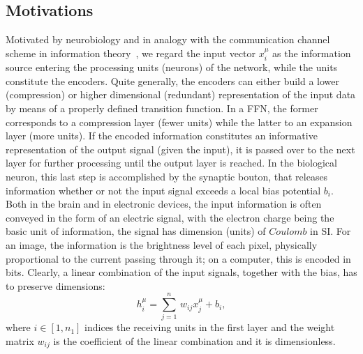\documentclass{article}
\begin{document}
\subsection{Motivations} \label{sub:mot}
%
 Motivated by neurobiology and in analogy with the communication channel scheme in information theory~\cite{mckay, jaynes}, we regard the input vector $x^{\mu}_i$ as the information source entering the processing units (neurons) of the network, while the units constitute the encoders. Quite generally, the encoders can either build a lower (compression) or higher dimensional (redundant) representation of the input data by means of a properly defined transition function. In a FFN, the former corresponds to a compression layer (fewer units) while the latter to an expansion layer (more units). If the encoded information constitutes an informative representation of the output signal (given the input), it is passed  over to the next layer for further processing until the output layer is reached. In the biological neuron, this last step is accomplished by the synaptic bouton, that releases information whether or not the input signal exceeds a local bias potential $b_i$. Both in the brain and in electronic devices, the input information is often conveyed in the form of an electric signal, with the electron charge being the basic unit of information, the signal has dimension (units) of $Coulomb$ in SI. For an image, the information is the brightness level of each pixel, physically proportional to the current passing through it; on a computer, this is encoded in bits. Clearly, a linear combination of the input signals, together with the bias, has to preserve dimensions:
%
\begin{equation} \label{eq:lincomb}
h^{\mu}_i = \sum_{j=1}^{n} \, w_{ij} x^{\mu}_j + b_i,
\end{equation}
%
where $i \in [1, n_1]$ indices the receiving units in the first layer and the weight matrix $ w_{ij}$ is the coefficient of the linear combination and it is dimensionless.
\end{document}
